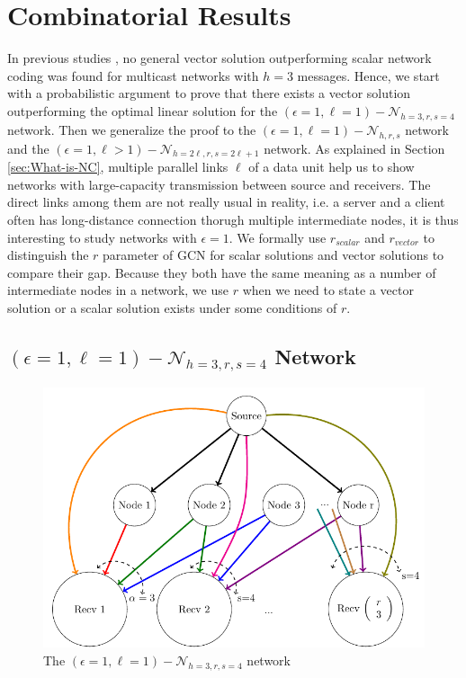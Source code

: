 \chapter{Combinatorial Results} \label{chap:comb_res}

In previous studies \cite{Wachter-Zeh:2018}, no general vector solution
outperforming scalar network coding was found for multicast networks
with $h=3$ messages. Hence, we start with a probabilistic argument
to prove that there exists a vector solution outperforming the optimal
linear solution for the $\left(\epsilon=1,\ell=1\right)-\mathcal{N}_{h=3,r,s=4}$
network. Then we generalize the proof to the $\left(\epsilon=1,\ell=1\right)-\mathcal{N}_{h,r,s}$
network and the $\left(\epsilon=1,\ell>1\right)-\mathcal{N}_{h=2\ell,r,s=2\ell+1}$
network. As explained in Section \ref{sec:What-is-NC}, multiple parallel
links $\ell$ of a data unit help us to show networks with large-capacity
transmission between source and receivers. The direct links among
them are not really usual in reality, i.e. a server and a client often
has long-distance connection thorugh multiple intermediate nodes,
it is thus interesting to study networks with $\epsilon=1$. We formally
use $r_{scalar}$ and $r_{vector}$ to distinguish the $r$ parameter
of GCN for scalar solutions and vector solutions to compare their
gap. Because they both have the same meaning as a number of intermediate
nodes in a network, we use $r$ when we need to state a vector solution
or a scalar solution exists under some conditions of $r$.

\section{$\left(\epsilon=1,\ell=1\right)-\mathcal{N}_{h=3,r,s=4}$ Network
\label{sec:Network_e1l1h3rs4}}

\begin{figure}[H]
\caption{The $(\epsilon=1,\ell=1)-\mathcal{N}_{h=3,r,s=4}$ network\label{fig:nw_e1_l1_h3_r_s4}}

\centering{}\includegraphics[width=0.5\paperwidth]{../figures/nw_e1_l1_h3_r_s4}
\end{figure}

